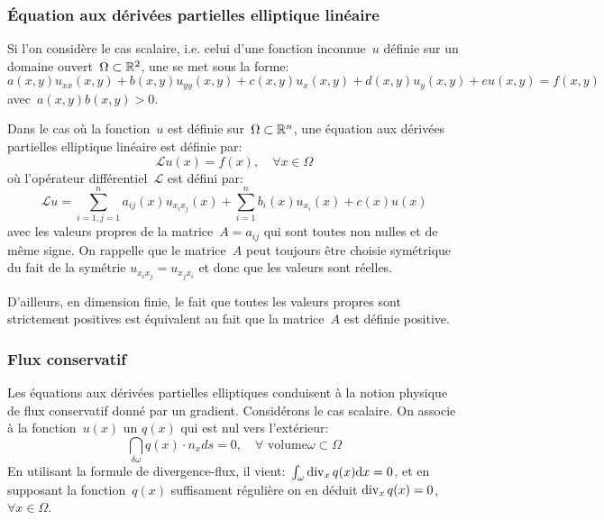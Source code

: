 \medskip
\subsubsection{Équation aux dérivées partielles elliptique linéaire}
Si l'on considère le cas scalaire, i.e. celui d'une fonction inconnue~$u$ définie sur un domaine 
ouvert~$\Omega\subset\mathbb R^2$, une  se met sous la forme:
\begin{equation}a(x, y)u_{xx}(x, y) + b(x, y)u_{yy}(x, y) + c(x, y)u_x(x, y) + d(x, y)u_y(x, y) + eu(x, y) = f(x, y)\end{equation}
avec~$a(x, y)b(x, y) > 0$.

Dans le cas où la fonction~$u$ est définie sur~$\Omega\subset\mathbb R^n$, une équation aux dérivées partielles elliptique 
linéaire est définie par:
\begin{equation} \mathcal{L}u(x) = f(x),\quad \forall x\in\Omega \end{equation}
où l'opérateur différentiel~$\mathcal{L}$ est défini par:
\begin{equation}
\mathcal{L}u = \sum_{i=1, j=1}^n a_{ij}(x)u_{x_ix_j} (x) +
\sum_{i=1}^n b_i(x)u_{x_i}(x) + c(x)u(x)
\end{equation}
avec les valeurs propres de la matrice~$A = a_{ij}$ qui sont toutes non nulles et de même signe. 
On rappelle que le matrice~$A$ peut toujours être choisie symétrique du fait de la symétrie 
$u_{x_ix_j} = u_{x_jx_i}$ et donc que les valeurs sont réelles.

D'ailleurs, en dimension finie, le fait que toutes les valeurs propres sont strictement positives
est équivalent au fait que la matrice~$A$ est définie positive.

\medskip
\subsubsection{Flux conservatif}
Les équations aux dérivées partielles elliptiques conduisent à la notion physique de flux conservatif donné
par un gradient. Considérons le cas scalaire. On associe à la fonction~$u(x)$ un 
$q(x)$ qui est nul vers l'extérieur:
\begin{equation}\dint_{\delta\omega} q(x)\cdot n_x ds=0,\quad\forall\text{ volume}\omega\subset\Omega\end{equation}
En utilisant la formule de divergence-flux, il vient:~$\int_\omega \operatorname{div}_xq(x)\mathrm dx=0$, et
en supposant la fonction~$q(x)$ suffisament régulière on en déduit
$\operatorname{div}_xq(x)=0$, $\forall x\in\Omega$.

